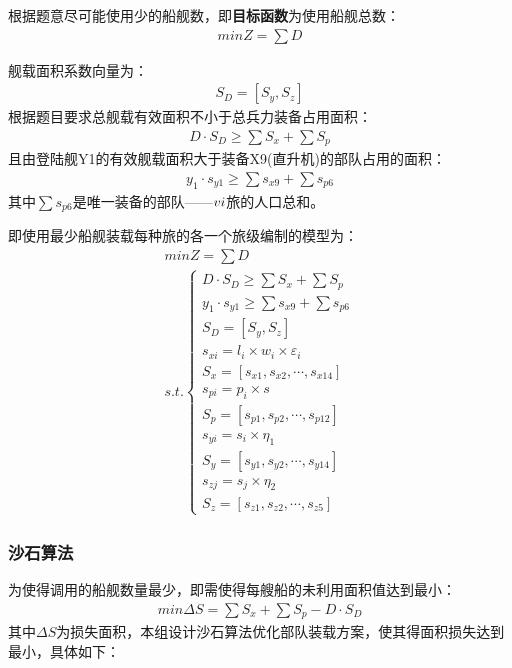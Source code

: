 \documentclass{whutmod}
\begin{document}
	    根据题意尽可能使用少的船舰数，即\textbf{目标函数}为使用船舰总数：
	     \begin{gather}
	     min Z=\sum D
	  \end{gather}
	    
	    
	   舰载面积系数向量为：
	    \begin{gather}
	    S_{D}=[S_{y}, S_{z}]
    	\end{gather}
    	根据题目要求总舰载有效面积不小于总兵力装备占用面积：
    	 \begin{gather}
    	 D\cdot S_{D}\geq \sum  S_{x} + \sum  S_{p}
    	 \end{gather}
    	 且由登陆舰Y1的有效舰载面积大于装备X9(直升机)的部队占用的面积：
    	  \begin{gather}
    	 y_{1}\cdot s_{y1}\geq \sum s_{x9}+ \sum  s_{p6}
    	 \end{gather}
    	 其中$\sum  s_{p6}$是唯一装备的部队——$\uppercase\expandafter{\romannumeral6}$旅的人口总和。
    	 
    	 即使用最少船舰装载每种旅的各一个旅级编制的模型为：
    	  \begin{gather}
    	 min Z=\sum D\\ 
    	  s.t.\left\{\begin{matrix}	 D\cdot S_{D}\geq \sum  S_{x} + \sum  S_{p}
    	 \\ y_{1}\cdot s_{y1}\geq \sum s_{x9}+ \sum  s_{p6}
    	 \\S_{D}=[S_{y}, S_{z}]
    	 \\ s_{xi}=l_{i}\times w_{i} \times \varepsilon _{i}
    	 \\S_{x}=[s_{x1},s_{x2},\cdots,s_{x14}]
    	 \\s_{pi}=p_{i}\times s
    	 \\S_{p}=[s_{p1},s_{p2},\cdots,s_{p12}]
    	 \\     s_{yi}=s_{i}\times \eta_{1}
    	 \\   S_{y}=[s_{y1},s_{y2},\cdots,s_{y14}]
    	 \\      s_{zj}=s_{j}\times \eta_{2}
    	 \\ S_{z}=[s_{z1},s_{z2},\cdots,s_{z5}]
    	 \end{matrix}\right. 
     	 \end{gather}
    	  \subsubsection{沙石算法}
		为使得调用的船舰数量最少，即需使得每艘船的未利用面积值达到最小：
	    \begin{gather*}
		min \Delta S= \sum  S_{x} + \sum  S_{p}-D\cdot S_{D} 
		\end{gather*}
	其中$\Delta S$为损失面积，本组设计沙石算法优化部队装载方案，使其得面积损失达到最小，具体如下：
\end{document}
